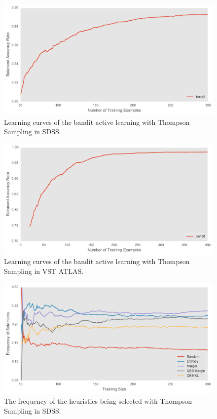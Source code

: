 \begin{figure}[tbp]
	\centering
	\includegraphics[width=\textwidth]{figures/bandit_lc_sdss}
	\caption{Learning curves of the bandit active learning with Thompson Sampling in SDSS.}
	\label{fig:bandit_lc_sdss} 
\end{figure}

\begin{figure}[tbp]
	\centering
	\includegraphics[width=\textwidth]{figures/bandit_lc_vst}
	\caption{Learning curves of the bandit active learning with Thompson Sampling in VST ATLAS.}
	\label{fig:bandit_lc_vst} 
\end{figure}

\begin{figure}[tbp]
	\centering
	\includegraphics[width=\textwidth]{figures/bandit_sel_sdss}
	\caption{The frequency of the heuristics being selected with Thompson Sampling in SDSS.}
	\label{fig:bandit_sel_sdss} 
\end{figure}

